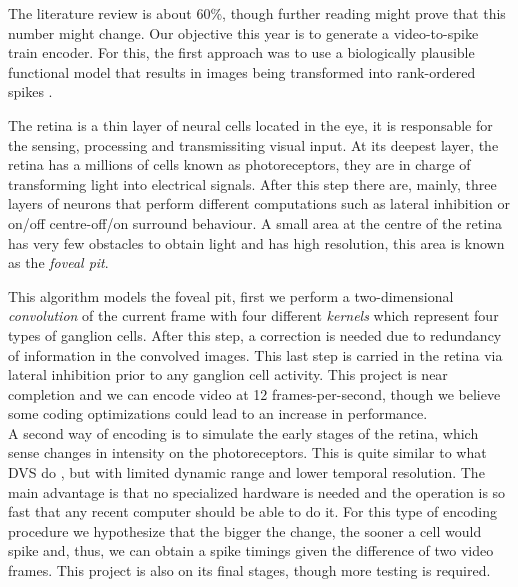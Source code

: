 The literature review is about 60\%, though further reading might prove that 
this number might change. Our objective this year is to generate a 
video-to-spike train encoder. For this, the first approach was to use a
biologically plausible functional model \cite{basab-model} that results in
images being transformed into rank-ordered spikes 
\cite{thorpe-spike-rapid-processing}.

The retina is a thin layer of neural cells located in the eye, it is responsable
for the sensing, processing and transmissiting visual input\cite{webvision}. 
At its deepest layer, the retina has a millions of cells known as 
photoreceptors, they are in charge of transforming light into electrical 
signals. After this step there are, mainly, three layers of neurons that 
perform different computations such as lateral inhibition or on/off 
centre-off/on surround behaviour\cite{webvision-midget}. A small area 
at the centre of the retina has very few obstacles to obtain light and has high
resolution, this area is known as the \emph{foveal pit}.

This algorithm models the foveal pit, first we perform a two-dimensional  
\emph{convolution} of the current frame with four different \emph{kernels}
which represent four types of ganglion cells. After this step, a correction is 
needed due to redundancy of information in the convolved images. This last step
is carried in the retina via lateral inhibition prior to any ganglion cell 
activity. This project is near completion and we can encode video at 12 frames-per-second, though we believe some coding optimizations could lead to an increase in performance.\\

A second way of encoding is to simulate the early stages of the retina, which
sense changes in intensity on the photoreceptors. This is quite similar to what 
DVS do \cite{aer-retina-bernabe, dvs-zurich}, but with limited dynamic range 
and lower temporal resolution. The main advantage is that no specialized 
hardware is needed and the operation is so fast that any recent computer should
be able to do it. For this type of encoding procedure we hypothesize that
the bigger the change, the sooner a cell would spike and, thus, we can obtain
a spike timings given the difference of two video frames. This project is also
on its final stages, though more testing is required.

